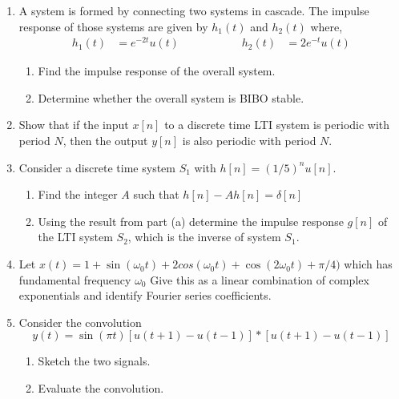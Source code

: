 \documentclass[12pt]{article}
\begin{document}
\begin{enumerate}
\begin{figure}[h]
    \centering
    
\caption{}
\end{figure}

\item A system is formed by connecting two systems in cascade. The impulse response of those systems are given by $h_{1}(t)$ and $h_{2}(t)$ where,  
     \begin{align*}
        h_1(t) &= e^{-2t}u(t)&\hspace{2cm} h_2(t) &= 2e^{-t}u(t)
     \end{align*}
\begin{enumerate}
    \item Find the impulse response of the overall system.
    \item Determine whether the overall system is BIBO stable.
\end{enumerate}

\item Show that if the input $x[n]$ to a discrete time LTI system is periodic with period $N$, then the output $y[n]$ is also periodic with period $N$.

\item Consider a discrete time system $S_1$ with $h[n] = (1/5)^{n}u[n]$.

\begin{enumerate}
    \item Find the integer $A$ such that $ h[n] - Ah[n] = \delta[n] $
    \item Using the result from part (a) determine the impulse response $g[n]$ of the LTI system $S_2$, which is the inverse of system $S_1$.
\end{enumerate}

\item Let $x(t) = 1 + \sin(\omega_0t) + 2cos(\omega_0t) + \cos(2\omega_0t)+\pi/4)$ which has fundamental frequency $\omega_0$ Give this as a linear combination of complex exponentials and identify Fourier series coefficients.
    
\item Consider the convolution
        \begin{equation*}
            y(t) = \sin(\pi t) \left[u(t+1) - u(t-1)\right] \ast \left[u(t+1) - u(t-1)\right]
        \end{equation*}
        \begin{enumerate}
            \item Sketch the two signals.
            \item Evaluate the convolution.
        \end{enumerate}
    

\end{enumerate}

\end{document}
